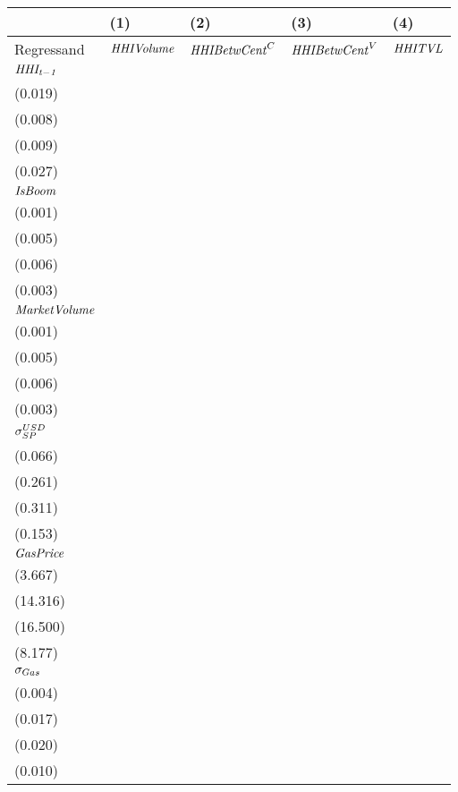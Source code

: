 \begin{tabular}{lllll}
\toprule
{} &                                   (1) &                                  (2) &                                  (3) &                                    (4) \\
\midrule
Regressand                &                     ${\it HHIVolume}$ &                ${\it HHIBetwCent}^C$ &                ${\it HHIBetwCent}^V$ &                         ${\it HHITVL}$ \\
$\it HHI_{t-1}$           &   \makecell{$0.799^{***}$ \\ (0.019)} &  \makecell{$0.962^{***}$ \\ (0.008)} &  \makecell{$0.957^{***}$ \\ (0.009)} &    \makecell{$0.543^{***}$ \\ (0.027)} \\
${\it IsBoom}$            &  \makecell{$-0.004^{***}$ \\ (0.001)} &  \makecell{$0.013^{***}$ \\ (0.005)} &  \makecell{$0.017^{***}$ \\ (0.006)} &    \makecell{$0.008^{***}$ \\ (0.003)} \\
${\it MarketVolume}$      &    \makecell{$-0.003^{*}$ \\ (0.001)} &    \makecell{$-0.000^{}$ \\ (0.005)} &    \makecell{$-0.001^{}$ \\ (0.006)} &     \makecell{$-0.005^{*}$ \\ (0.003)} \\
${\it \sigma}^{USD}_{SP}$ &      \makecell{$0.007^{}$ \\ (0.066)} &    \makecell{$-0.111^{}$ \\ (0.261)} &    \makecell{$-0.171^{}$ \\ (0.311)} &   \makecell{$-0.660^{***}$ \\ (0.153)} \\
${\it GasPrice}$          &     \makecell{$-3.235^{}$ \\ (3.667)} &   \makecell{$14.400^{}$ \\ (14.316)} &    \makecell{$6.408^{}$ \\ (16.500)} &  \makecell{$-21.341^{***}$ \\ (8.177)} \\
${\it \sigma}_{Gas}$      &   \makecell{$-0.011^{**}$ \\ (0.004)} &     \makecell{$0.005^{}$ \\ (0.017)} &     \makecell{$0.005^{}$ \\ (0.020)} &       \makecell{$0.003^{}$ \\ (0.010)} \\

\end{tabular}
